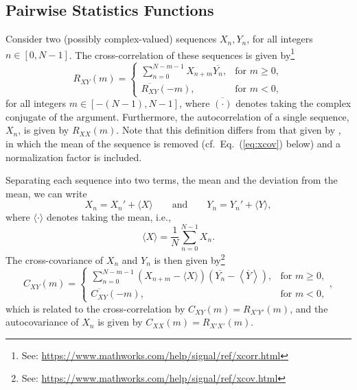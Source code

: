 \documentclass[11pt, oneside]{article}
\newcommand{\eqnref}[1]{Eq.~(\ref{#1})}
\begin{document}
\subsection{Pairwise Statistics Functions}
Consider two (possibly complex-valued) sequences $X_n,Y_n$, for all integers $n \in [0,N-1]$.
The cross-correlation of these sequences is given by\footnote{See: \url{https://www.mathworks.com/help/signal/ref/xcorr.html}}
\begin{equation}\label{eq:xcorr}
R_{XY}(m) =
\begin{cases}
\displaystyle \sum_{n=0}^{N-m-1} X_{n+m} \overline{Y_n}, & \text{for } m \geq 0,\\[20pt]
\overline{R_{XY}}(-m), & \text{for } m < 0,
\end{cases}
\end{equation}
for all integers $m \in [-(N-1),N-1]$, where $\overline{(\cdot)}$ denotes taking the complex conjugate of the argument.
Furthermore, the autocorrelation of a single sequence, $X_n$, is given by $R_{XX}(m)$.
Note that this definition differs from that given by \citet[Sec.~8.2.1]{Stull1988}, in which the mean of the sequence is removed (cf.~\eqnref{eq:xcov} below) and a normalization factor is included.

Separating each sequence into two terms, the mean and the deviation from the mean, we can write
\begin{equation}
X_n = X_n' + \langle X \rangle
\quad\quad \text{and} \quad\quad
Y_n = Y_n' + \langle Y \rangle,
\end{equation}
where $\langle \cdot \rangle$ denotes taking the mean, i.e.,
\begin{equation}
\langle X \rangle = \frac{1}{N} \sum_{n = 0}^{N-1} X_n.
\end{equation}
The cross-covariance of $X_n$ and $Y_n$ is then given by\footnote{See: \url{https://www.mathworks.com/help/signal/ref/xcov.html}}
\begin{equation}\label{eq:xcov}
C_{XY}(m) = 
\begin{cases}
\displaystyle \sum_{n=0}^{N-m-1} \left( X_{n+m} - \langle X \rangle \right) \left( \overline{Y_n} - \left\langle \overline{Y} \right\rangle \right), & \text{for } m \geq 0,\\[20pt]
\overline{C_{XY}}(-m), & \text{for } m < 0,
\end{cases},
\end{equation}
which is related to the cross-correlation by $C_{XY}(m) = R_{X'Y'}(m)$, and the autocovariance of $X_n$ is given by $C_{XX}(m) = R_{X'X'}(m)$.
\end{document}

